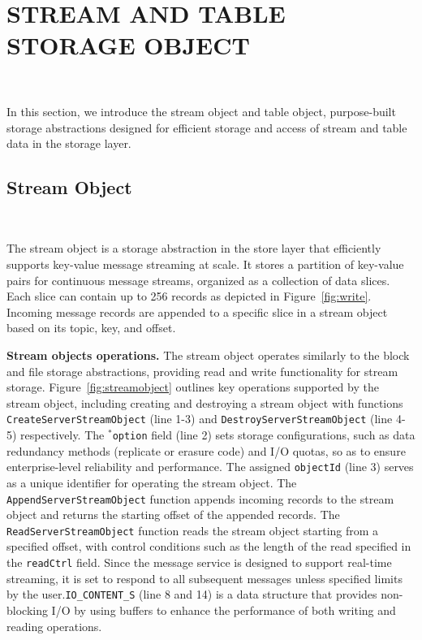 \section{STREAM AND TABLE STORAGE OBJECT} 
~\label{sec:datagen}

In this section, we introduce the stream object and table object, purpose-built storage abstractions designed for efficient storage and access of stream and table data in the storage layer.


\subsection{Stream Object}~\label{subsec:streamobject}

The stream object is a storage abstraction in the store layer that efficiently supports key-value message streaming at scale. It stores a partition of key-value pairs for continuous message streams, organized as a collection of data slices. Each slice can contain up to 256 records as depicted in Figure~\ref{fig:write}. Incoming message records are appended  to a specific slice in a stream object based on its topic, key, and offset.

\noindent \textbf{Stream objects operations.} The stream object operates similarly to the block and file storage abstractions, providing read and write functionality for stream storage. Figure~\ref{fig:streamobject} outlines key operations supported by the stream object, including creating and destroying a stream object with  functions \texttt{CreateServerStreamObject} (line 1-3) and \texttt{DestroyServerStreamObject} (line 4-5) respectively. The \texttt{$^*$option} field (line 2) sets storage configurations, such as data redundancy methods (replicate or erasure code) and I/O quotas, so as to ensure enterprise-level reliability and performance. The assigned \texttt{objectId} (line 3) serves as a unique identifier for operating the stream object. The \texttt{AppendServerStreamObject} function appends incoming records  to the stream object and returns the starting offset of the appended records. The \texttt{ReadServerStreamObject} function reads the stream object starting from a specified offset, with control conditions such as the length of the read specified in the \texttt{readCtrl} field. 
Since the message service is designed to support real-time streaming, it is set to respond to  all subsequent messages unless specified  limits by the user.\texttt{IO\_CONTENT\_S} (line 8 and 14) is a data structure that provides non-blocking I/O by using buffers to enhance the performance of both writing and reading operations.


